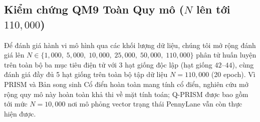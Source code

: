 \documentclass[10pt,twocolumn,letterpaper]{article}
\begin{document}
\subsection{Kiểm chứng QM9 Toàn Quy mô ($N$ lên tới $110{,}000$)}
\label{sec:scaling}

Để đánh giá hành vi mô hình qua các khối lượng dữ liệu, chúng tôi mở rộng đánh giá lên $N \in \{1{,}000,\; 5{,}000,\; 10{,}000,\; 25{,}000,\; 50{,}000,\; 110{,}000\}$ phân tử huấn luyện trên toàn bộ ba mục tiêu điện tử với 3 hạt giống độc lập (hạt giống $42$--$44$), cùng đánh giá đầy đủ 5 hạt giống trên toàn bộ tập dữ liệu $N = 110{,}000$ (20 epoch). Vì PRISM và Bản song sinh Cổ điển hoàn toàn mang tính cổ điển, nghiên cứu mở rộng quy mô này hoàn toàn khả thi về mặt tính toán; Q-PRISM được bao gồm tới mức $N = 10{,}000$ nơi mô phỏng vector trạng thái PennyLane vẫn còn thực hiện được.
\end{document}

